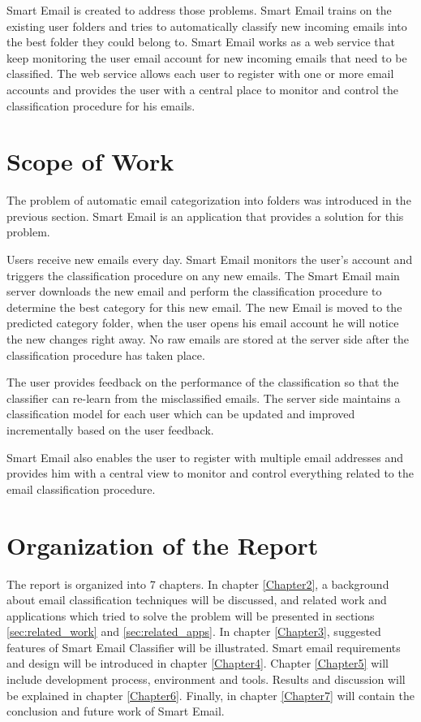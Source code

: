 Smart Email is created to address those problems. Smart Email trains on the 
existing user folders and tries to automatically classify new incoming emails 
into the best folder they could belong to. Smart Email works as a web service 
that keep monitoring the user email account for new incoming emails that need 
to be classified. The web service allows each user to register with one or more 
email accounts and provides the user with a central place to monitor and control 
the classification procedure for his emails.

\section{Scope of Work}

The problem of automatic email categorization into folders was introduced
in the previous section. Smart Email is an application that provides a solution
for this problem.

Users receive new emails every day. Smart Email monitors the user's 
account and triggers the classification procedure on any new emails. 
The Smart Email main server downloads the new email and perform the 
classification procedure to determine the best category for this new 
email. The new Email is moved to the predicted category folder, when the user 
opens his email account he will notice the new changes right away. No raw emails 
are stored at the server side after the classification procedure has taken place.

The user provides feedback on the performance of the classification so that the 
classifier can re-learn from the misclassified emails. The server side maintains 
a classification model for each user which can be updated and improved incrementally 
based on the user feedback.

Smart Email also enables the user to register with multiple email addresses and 
provides him with a central view to monitor and control everything related to 
the email classification procedure.


\section{Organization of the Report}

The report is organized into 7 chapters. In chapter \ref{Chapter2}, a background 
about email classification techniques will be discussed, and related work and applications
which tried to solve the problem will be presented in sections \ref{sec:related_work} 
and \ref{sec:related_apps}. In chapter \ref{Chapter3}, suggested features of Smart 
Email Classifier will be illustrated.
Smart email requirements and design will be introduced in chapter \ref{Chapter4}.
Chapter \ref{Chapter5} will include development process, environment and tools. 
Results and discussion will be explained in chapter \ref{Chapter6}. Finally, in 
chapter \ref{Chapter7} will contain the conclusion and future work of Smart Email.


